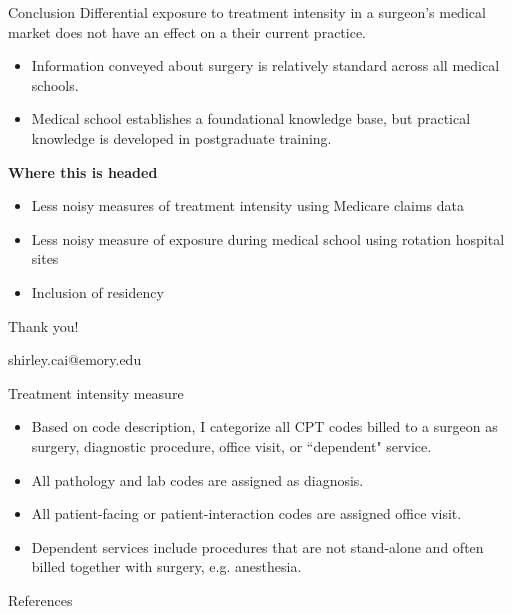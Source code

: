 \documentclass[10pt,aspectratio=169]{beamer}
\begin{document}
\begin{frame}{Conclusion}
    Differential exposure to treatment intensity in a surgeon's medical market does not have an effect on a their current practice. 
        \begin{itemize}
            \item Information conveyed about surgery is relatively standard across all medical schools. 
            \item Medical school establishes a foundational knowledge base, but practical knowledge is developed in postgraduate training. 
        \end{itemize}

    \vspace{2.5mm}
    \textbf{Where this is headed}
        \begin{itemize}
            \item Less noisy measures of treatment intensity using Medicare claims data 
            \item Less noisy measure of exposure during medical school using rotation hospital sites 
            \item Inclusion of residency
        \end{itemize}
\end{frame}

\begin{frame}[standout]
    \Large Thank you! 
    
    \vspace{5mm}
    \small shirley.cai@emory.edu
\end{frame}

\appendix

\begin{frame}{Treatment intensity measure} \label{intensity}
    \begin{itemize}
        \item Based on code description, I categorize all CPT codes billed to a surgeon as surgery, diagnostic procedure, office visit, or ``dependent" service. 
        \item All pathology and lab codes are assigned as diagnosis. 
        \item All patient-facing or patient-interaction codes are assigned office visit. 
        \item Dependent services include procedures that are not stand-alone and often billed together with surgery, e.g. anesthesia. 
    \end{itemize}

    \hyperlink{rq}{}
\end{frame}

\begin{frame}[allowframebreaks]{References}
    \printbibliography[heading=none]
\end{frame}
\end{document}
